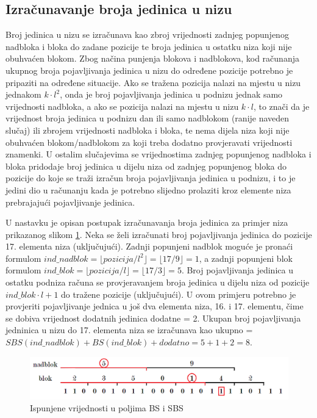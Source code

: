 \subsection{Izračunavanje broja jedinica u nizu}
Broj jedinica u nizu se izračunava kao zbroj vrijednosti zadnjeg popunjenog nadbloka i bloka do zadane pozicije te broja jedinica u ostatku niza koji nije obuhvaćen blokom. Zbog načina punjenja blokova i nadblokova, kod računanja ukupnog broja pojavljivanja jedinica u nizu do određene pozicije potrebno je pripaziti na određene situacije. Ako se tražena pozicija nalazi na mjestu u nizu jednakom $k\cdot l^2$, onda je broj pojavljivanja jedinica u podnizu jednak samo vrijednosti nadbloka, a ako se pozicija nalazi na mjestu u nizu $k\cdot l$, to znači da je vrijednost broja jedinica u podnizu dan ili samo nadblokom (ranije naveden slučaj) ili zbrojem vrijednosti nadbloka i bloka, te nema dijela niza koji nije obuhvaćen blokom/nadblokom za koji treba dodatno provjeravati vrijednosti znamenki. U ostalim slučajevima se vrijednostima zadnjeg popunjenog nadbloka i bloka pridodaje broj jedinica u dijelu niza od zadnjeg popunjenog bloka do pozicije do koje se traži izračun broja pojavljivanja jedinica u podnizu, i to je jedini dio u računanju kada je potrebno slijedno prolaziti kroz elemente niza prebrajajući pojavljivanje jedinica.

U nastavku je opisan postupak izračunavanja broja jedinica za primjer niza prikazanog slikom \ref{rrr2}. Neka se želi izračunati broj pojavljivanja jedinica do pozicije 17. elementa niza (uključujući). Zadnji popunjeni nadblok moguće je pronaći formulom $ind\_nadblok = \lfloor pozicija/l^2 \rfloor = \lfloor 17/9 \rfloor = 1$, a zadnji popunjeni blok formulom $ind\_blok = \lfloor pozicija/l \rfloor = \lfloor 17/3 \rfloor = 5$. Broj pojavljivanja jedinica u ostatku podniza računa se provjeravanjem broja jedinica u dijelu niza od pozicije $ind\_blok\cdot l+1$ do tražene pozicije (uključujući). U ovom primjeru potrebno je provjeriti pojavljivanje jednica u još dva elementa niza, 16. i 17. elementu, čime se dobiva vrijednost dodatnih jedinica dodatne = 2. Ukupan broj pojavljivanja jedninica u nizu do 17. elementa niza se izračunava kao ukupno  = $SBS(ind\_nadblok) + BS(ind\_blok) + dodatno = 5 + 1 + 2 = 8$.

\begin{figure}[H]
\centering
\includegraphics[width=\linewidth]{./pictures/rrr2.png}
\caption{Ispunjene vrijednosti u poljima BS i SBS}\label{rrr2}
\end{figure}


